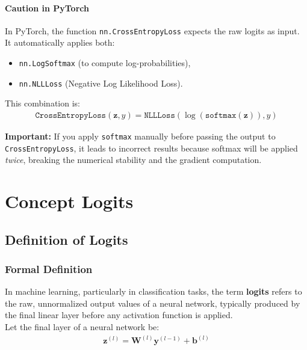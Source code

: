 \paragraph{Caution in PyTorch}
In PyTorch, the function \verb+nn.CrossEntropyLoss+ expects the raw logits as input. It automatically applies both:
\begin{itemize}
	\item \verb+nn.LogSoftmax+ (to compute log-probabilities),
	\item \verb+nn.NLLLoss+ (Negative Log Likelihood Loss).
\end{itemize}

This combination is:
\begin{align}
	\texttt{CrossEntropyLoss}(\mathbf{z}, y) = \texttt{NLLLoss}(\log(\texttt{softmax}(\mathbf{z})), y)
\end{align}

\textbf{Important:} If you apply \verb+softmax+ manually before passing the output to \verb+CrossEntropyLoss+, it leads to incorrect results because softmax will be applied \emph{twice}, breaking the numerical stability and the gradient computation.


\section{Concept Logits}
\subsection*{Definition of Logits}

\subsubsection*{Formal Definition}

In machine learning, particularly in classification tasks, the term \textbf{logits} refers to the raw, unnormalized output values of a neural network, typically produced by the final linear layer before any activation function is applied.\\ 

Let the final layer of a neural network be:
\begin{align}
\mathbf{z}^{(l)} = \mathbf{W}^{(l)}  \mathbf{y}^{(l-1)} + \mathbf{b}^{(l)} 
\end{align}


